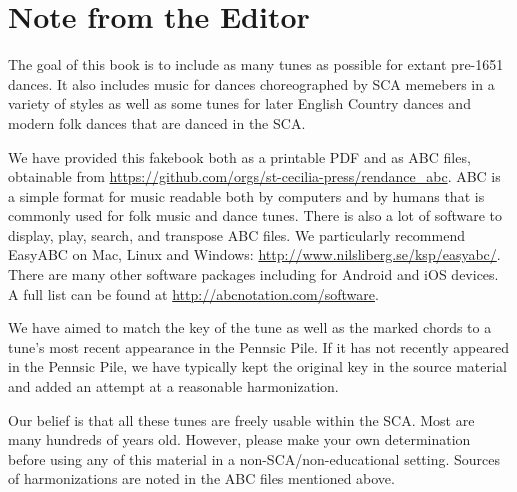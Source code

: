 \documentclass[11pt]{book}
\begin{document}
\frontmatter

\pagestyle{fancy}

\fancyhf{}

\fancyhead[LE,RO]{\thepage}
\renewcommand{\headrulewidth}{0pt}
\renewcommand{\footrulewidth}{0pt}
\setlength{\parindent}{0pt}
\setlength{\parskip}{11pt plus 2pt minus 2pt}

%
%
%
%
%
%

\section*{Note from the Editor}

The goal of this book is to include as many tunes as possible for extant
pre-1651 dances. It also includes music for dances choreographed by SCA
memebers in a variety of styles as well as some tunes for later English Country
dances and modern folk dances that are danced in the SCA.

We have provided this fakebook both as a printable PDF and as ABC files,
obtainable from \url{https://github.com/orgs/st-cecilia-press/rendance\_abc}.
ABC is a simple format for music readable both by computers and by humans that
is commonly used for folk music and dance tunes. There is also a lot of
software to display, play, search, and transpose ABC files. We particularly
recommend EasyABC on Mac, Linux and Windows:
\url{http://www.nilsliberg.se/ksp/easyabc/}. There are many other software
packages including for Android and iOS devices. A full list can be found at
\url{http://abcnotation.com/software}.

We have aimed to match the key of the tune as well as the marked chords to a
tune's most recent appearance in the Pennsic Pile. If it has not recently
appeared in the Pennsic Pile, we have typically kept the original key in the
source material and added an attempt at a reasonable harmonization.

Our belief is that all these tunes are freely usable within the SCA. Most are
many hundreds of years old. However, please make your own determination before
using any of this material in a non-SCA/non-educational setting. Sources of
harmonizations are noted in the ABC files mentioned above.
\end{document}
